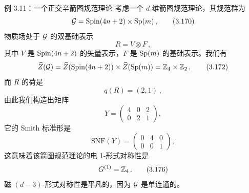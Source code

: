 

\begin{examplebox}{例 3.11：一个正交辛箭图规范理论}
考虑一个 $d$ 维箭图规范理论，其规范群为
\begin{equation}
    \mathcal{G} = \mathrm{Spin}(4n+2) \times \mathrm{Sp}(m) \,,
    \tag{3.170}
\end{equation}
物质场处于 $\mathcal{G}$ 的双基础表示
\begin{equation}
    R = V \otimes F \,,
    \tag{3.171}
\end{equation}
其中 $V$ 是 $\mathrm{Spin}(4n+2)$ 的矢量表示，$F$ 是 $\mathrm{Sp}(m)$ 的基础表示。我们有
\begin{equation}
    \widehat{Z}(\mathcal{G}) = \widehat{Z}(\mathrm{Spin}(4n+2)) \times \widehat{Z}(\mathrm{Sp}(m)) = \mathbb{Z}_4 \times \mathbb{Z}_2 \,,
    \tag{3.172}
\end{equation}
而 $R$ 的荷是
\begin{equation}
    q(R) = (2,1) \,,
    \tag{3.173}
\end{equation}
由此我们构造出矩阵
\begin{equation}
    Y = \begin{pmatrix} 4 & 0 & 2 \\ 0 & 2 & 1 \end{pmatrix} ,
    \tag{3.174}
\end{equation}
它的 Smith 标准形是
\begin{equation}
    \mathrm{SNF}(Y) = \begin{pmatrix} 0 & 4 & 0 \\ 0 & 0 & 1 \end{pmatrix} ,
    \tag{3.175}
\end{equation}
这意味着该箭图规范理论的电 1-形式对称性是
\begin{equation}
    G^{(1)} = \mathbb{Z}_4 \,.
    \tag{3.176}
\end{equation}
磁 $(d-3)$-形式对称性是平凡的，因为 $\mathcal{G}$ 是单连通的。
\end{examplebox}


